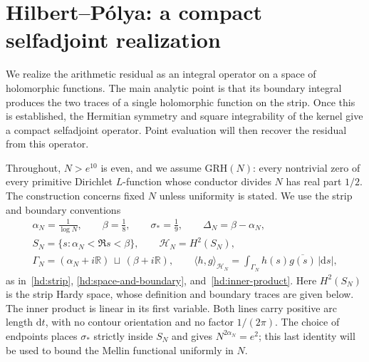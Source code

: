 \documentclass[12pt,a4paper]{amsart}
\numberwithin{equation}{section}
\theoremstyle{plain}
\theoremstyle{definition}
\theoremstyle{remark}
\begin{document}
\section{Hilbert--P\'olya: a compact selfadjoint realization}
\label{proof:sec:qp-foundation}

We realize the arithmetic residual as an integral operator on a
space of holomorphic functions. The main analytic point is that its
boundary integral produces the two traces of a single holomorphic
function on the strip. Once this is established, the Hermitian
symmetry and square integrability of the kernel give a compact
selfadjoint operator. Point evaluation will then recover the
residual from this operator.

Throughout, $N>e^{10}$ is even, and we assume $\mathrm{GRH}(N)$:
every nontrivial zero of every primitive Dirichlet $L$-function
whose conductor divides $N$ has real part $1/2$.
The construction concerns fixed $N$ unless uniformity is stated.
We use the strip and boundary conventions
\[
 \begin{gathered}
 \alpha_N=\frac1{\log N},\qquad \beta=\frac18,\qquad
 \sigma_*=\frac19,\qquad \Delta_N=\beta-\alpha_N,\\
 S_N=\{s:\alpha_N<\Re s<\beta\},\qquad
 \mathcal H_N=H^2(S_N),\\
 \Gamma_N=(\alpha_N+i\mathbb R)\,\sqcup\,(\beta+i\mathbb R),\qquad
 \langle h,g\rangle_{\mathcal H_N}
       =\int_{\Gamma_N}h(s)\overline{g(s)}\,|\mathrm{d}s|,
 \end{gathered}
\]
as in~\eqref{hd:strip}, \eqref{hd:space-and-boundary}, and~\eqref{hd:inner-product}.
Here $H^2(S_N)$ is the strip Hardy space, whose definition and
boundary traces are given below. The inner product is linear in
its first variable. Both lines carry positive arc length $\mathrm{d}t$,
with no contour orientation and no factor $1/(2\pi)$.
The choice of endpoints places $\sigma_*$ strictly inside $S_N$
and gives $N^{2\alpha_N}=e^2$; this last identity will be used to
bound the Mellin functional uniformly in $N$.
\end{document}
